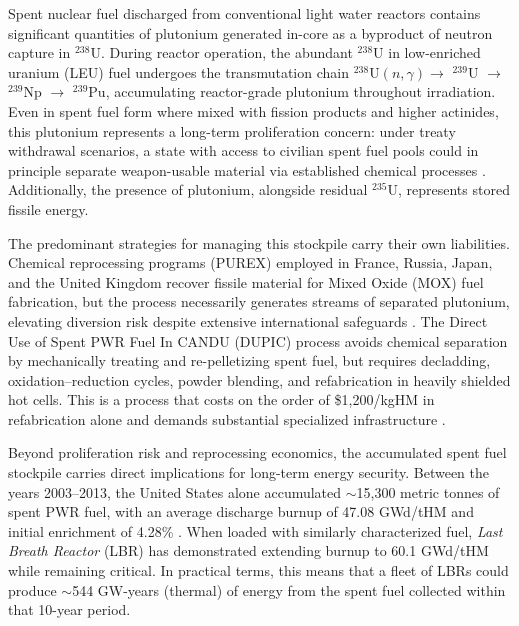 

Spent nuclear fuel discharged from conventional light water reactors contains significant quantities of plutonium generated in-core as a byproduct of neutron capture in $^{238}$U. During reactor operation, the abundant $^{238}$U in low-enriched uranium (LEU) fuel undergoes the transmutation chain $^{238}$U$(n,\gamma) \to$ $^{239}$U $\to$ $^{239}$Np $\to$ $^{239}$Pu, accumulating reactor-grade plutonium throughout irradiation. Even in spent fuel form where mixed with fission products and higher actinides, this plutonium represents a long-term proliferation concern: under treaty withdrawal scenarios, a state with access to civilian spent fuel pools could in principle separate weapon-usable material via established chemical processes 
\cite{Feiveson2004NuclearDiversion}. Additionally, the presence of plutonium, alongside residual $^{235}$U, represents stored fissile energy.

The predominant strategies for managing this stockpile carry their own liabilities. Chemical reprocessing programs (PUREX) employed in France, Russia, Japan, and the United Kingdom recover fissile material for Mixed Oxide (MOX) fuel fabrication, but the process necessarily generates streams of separated plutonium, elevating diversion risk despite extensive international safeguards \cite{2008SpentIAEA-TECDOC-1587}. The Direct Use of Spent PWR Fuel In CANDU (DUPIC) process avoids chemical separation by mechanically treating and re-pelletizing spent fuel, but requires decladding, oxidation--reduction cycles, powder blending, and refabrication in heavily shielded hot cells. This is a process that costs on the order of \$1,200/kgHM in refabrication alone and demands substantial specialized infrastructure \cite{Ko2001EconomicCost}.

Beyond proliferation risk and reprocessing economics, the accumulated spent fuel stockpile carries direct implications for long-term energy security. Between the years 2003–2013, the United States alone accumulated $\sim$15,300 metric tonnes of spent PWR fuel, with an average discharge burnup of 47.08 GWd/tHM and initial enrichment of 4.28\% \cite{HuNUREG/CR-72271968-2013.}. When loaded with similarly characterized fuel, \textit{Last Breath Reactor} (LBR) has demonstrated extending burnup to 60.1 GWd/tHM while remaining critical. In practical terms, this means that a fleet of LBRs could produce $\sim$544 GW-years (thermal) of energy from the spent fuel collected within that 10-year period.

